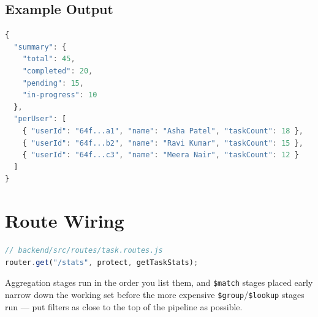 \subsection{Example Output}

\begin{lstlisting}[language=JavaScript]
{
  "summary": {
    "total": 45,
    "completed": 20,
    "pending": 15,
    "in-progress": 10
  },
  "perUser": [
    { "userId": "64f...a1", "name": "Asha Patel", "taskCount": 18 },
    { "userId": "64f...b2", "name": "Ravi Kumar", "taskCount": 15 },
    { "userId": "64f...c3", "name": "Meera Nair", "taskCount": 12 }
  ]
}
\end{lstlisting}

\section{Route Wiring}

\begin{lstlisting}[language=JavaScript]
// backend/src/routes/task.routes.js
router.get("/stats", protect, getTaskStats);
\end{lstlisting}

\begin{tipbox}[TIP]
Aggregation stages run in the order you list them, and \texttt{\$match}
stages placed early narrow down the working set before the more expensive
\texttt{\$group}/\texttt{\$lookup} stages run --- put filters as close to the
top of the pipeline as possible.
\end{tipbox}
